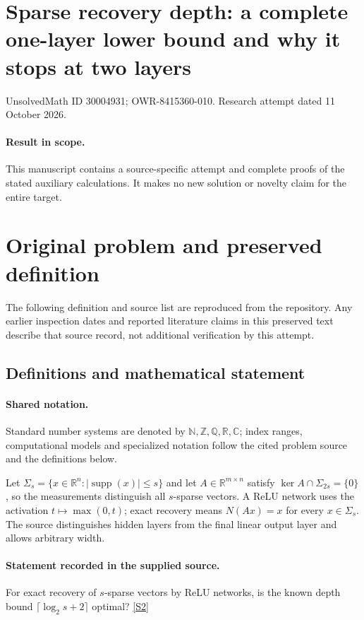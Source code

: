 \documentclass[11pt]{article}
\begin{document}
\section*{Sparse recovery depth: a complete one-layer lower bound and why it stops at two layers}
\noindent UnsolvedMath ID 30004931; OWR-8415360-010. Research attempt dated 11 October 2026.
\paragraph{Result in scope.}This manuscript contains a source-specific attempt and complete proofs of the stated auxiliary calculations. It makes no new solution or novelty claim for the entire target.
\section{Original problem and preserved definition}
The following definition and source list are reproduced from the repository. Any earlier inspection dates and reported literature claims in this preserved text describe that source record, not additional verification by this attempt.
\subsection{Definitions and mathematical statement}

\paragraph{Shared notation.}Standard number systems are denoted by $\mathbb N,\mathbb Z,\mathbb Q,\mathbb R,\mathbb C$; index ranges, computational models and specialized notation follow the cited problem source and the definitions below.


Let $\Sigma_s=\{x\in\mathbb R^n:|\operatorname{supp}(x)|\leq s\}$ and let $A\in\mathbb R^{m\times n}$ satisfy $\ker A\cap\Sigma_{2s}=\{0\}$, so the measurements distinguish all $s$-sparse vectors. A ReLU network uses the activation $t\mapsto\max(0,t)$; exact recovery means $N(Ax)=x$ for every $x\in\Sigma_s$. The source distinguishes hidden layers from the final linear output layer and allows arbitrary width.
\paragraph{Statement recorded in the supplied source.}
For exact recovery of $s$-sparse vectors by ReLU networks, is the known depth bound $\lceil\log_2s+2\rceil$ optimal? \href{https://doi.org/10.4171/owr/2021/55}{[S2]}
\end{document}
